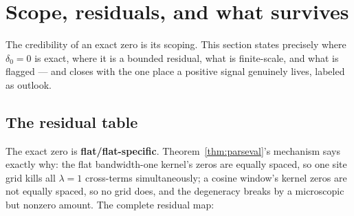 \documentclass[11pt]{article}
\theoremstyle{plain}
\theoremstyle{definition}
\theoremstyle{remark}
\begin{document}
\section{Scope, residuals, and what survives}
\label{sec:scope}

The credibility of an exact zero is its scoping. This section states precisely
where $\delta_0 = 0$ is exact, where it is a bounded residual, what is
finite-scale, and what is flagged --- and closes with the one place a positive
signal genuinely lives, labeled as outlook.

\subsection{The residual table}

The exact zero is \textbf{flat/flat-specific}. Theorem~\ref{thm:parseval}'s
mechanism says exactly why: the flat bandwidth-one kernel's zeros are equally
spaced, so one site grid kills all $\lambda = 1$ cross-terms simultaneously; a
cosine window's kernel zeros are not equally spaced, so no grid does, and the
degeneracy breaks by a microscopic but nonzero amount. The complete residual map:
\end{document}
